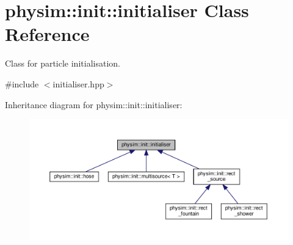 \hypertarget{classphysim_1_1init_1_1initialiser}{}\section{physim\+:\+:init\+:\+:initialiser Class Reference}
\label{classphysim_1_1init_1_1initialiser}


Class for particle initialisation.  




{\ttfamily \#include $<$initialiser.\+hpp$>$}



Inheritance diagram for physim\+:\+:init\+:\+:initialiser\+:\nopagebreak
\begin{figure}[H]
\begin{center}
\leavevmode
\includegraphics[width=350pt]{classphysim_1_1init_1_1initialiser__inherit__graph}
\end{center}
\end{figure}
